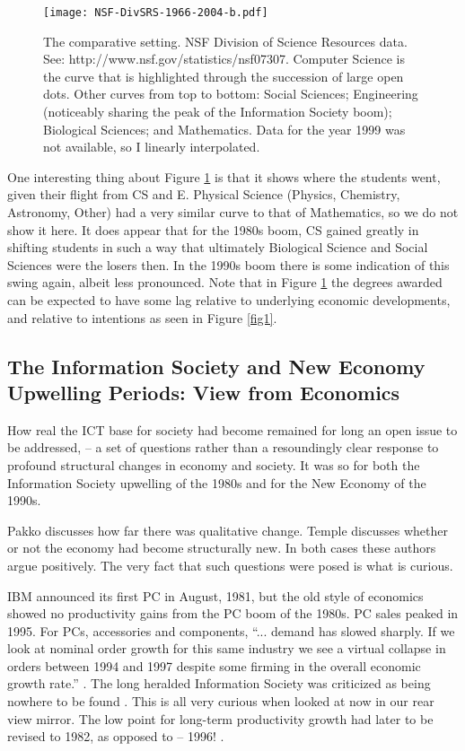 \documentclass{article}
\begin{document}
\begin{figure}
\texttt{[image: NSF-DivSRS-1966-2004-b.pdf]}
\caption{The comparative setting.  NSF Division of 
Science Resources data.  See: http://www.nsf.gov/statistics/nsf07307.
Computer Science is the curve that is highlighted through the 
succession of large open dots.  
Other curves from top to bottom: Social Sciences; Engineering
(noticeably sharing the peak of the Information Society boom); 
Biological Sciences; and Mathematics.  Data for the year 1999 was not 
available, so I linearly interpolated.}  
\label{fig3}
\end{figure}
 
One interesting thing about Figure \ref{fig3} 
is that it shows where the students went, 
given their flight from CS and E.   Physical Science (Physics, Chemistry, 
Astronomy, 
Other) had a very similar curve to that of Mathematics, so we do not show 
it here. 
It does appear that for the 1980s boom, CS gained greatly in 
shifting 
students in such a way that ultimately Biological Science and Social 
Sciences were the losers then.   In the 1990s boom there is some
indication of this swing again, albeit less pronounced.  
Note that in Figure \ref{fig3} the 
degrees awarded can be expected to have some lag relative to 
underlying economic developments, and relative to intentions as 
seen in Figure \ref{fig1}.  

\subsection{The Information Society and 
New Economy Upwelling Periods: View from Economics}
\label{econview}

How real the ICT base for society had become remained for long an
open issue to be addressed, -- a set of questions 
rather than a resoundingly clear response
to profound structural changes in economy and society.  It was so
for both the Information Society upwelling of the 1980s and for the  
New Economy of the 1990s.
  
Pakko \cite{pakko} discusses how far there was qualitative change. 
Temple \cite{temple} discusses whether or not the economy had
become structurally new.  
In both cases these authors argue positively.  The very fact that 
such questions were posed is what is curious.

IBM announced its first PC in August, 1981, but the old style of 
economics showed no productivity gains from the PC boom of the 1980s.  
PC sales peaked in 1995.  For PCs, accessories and components, 
``... demand has slowed sharply. If we 
look at nominal order growth for this same industry we see a virtual 
collapse in orders 
between 1994 and 1997 despite some firming in the overall economic 
growth rate.''  \cite{veneroso}.    The long heralded Information 
Society was criticized as being nowhere to be found \cite{mandel}.
This is all very curious when looked at now in our rear view mirror.  
The low point for long-term productivity growth had later
to be revised to 1982, as 
opposed to -- 1996! \cite{mandel}. 
\end{document}
